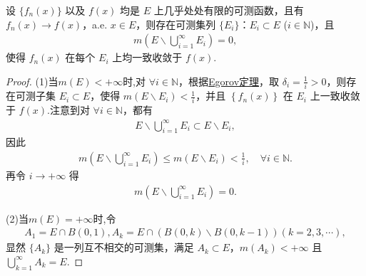\documentclass[../../main.tex]{subfiles}%
\begin{document}
\begin{corollary}
设 $\{f_n(x)\}$ 以及 $f(x)$ 均是 $E$ 上几乎处处有限的可测函数，且有 $f_n(x)\to f(x)$，a.e. $x\in E$，则存在可测集列 $\{E_i\}$：$E_i\subset E$ ($i\in\mathbb{N}$)，且
\begin{align*}
m\left(E\backslash\bigcup_{i = 1}^{\infty}E_i\right)=0,
\end{align*}
使得 $f_n(x)$ 在每个 $E_i$ 上均一致收敛于 $f(x)$. 
\end{corollary}
\begin{proof}

(1)当$m(E)<+\infty$时,对 $\forall i\in \mathbb{N}$，根据\hyperref[theorem:Egorov定理]{Egorov定理}，取 $\delta _i=\frac{1}{i}>0$，则存在可测子集 $E_i\subset E$，使得 $m\left( E\backslash E_i \right) <\frac{1}{i}$，并且 $\left\{ f_n\left( x \right) \right\}$ 在 $E_i$ 上一致收敛于 $f\left( x \right)$.注意到对 $\forall i\in \mathbb{N}$，都有
\begin{align*}
E\backslash \bigcup_{i=1}^{\infty}{E_i}\subset E\backslash E_i,
\end{align*}
因此
\begin{align*}
m\left( E\backslash \bigcup_{i=1}^{\infty}{E_i} \right) \leqslant m\left( E\backslash E_i \right) <\frac{1}{i},\quad \forall i\in \mathbb{N}.
\end{align*}
再令 $i\rightarrow +\infty$ 得
\begin{align*}
m\left( E\backslash \bigcup_{i=1}^{\infty}{E_i} \right) =0.
\end{align*}

(2)当$m(E)=+\infty$时,令
\begin{align*}
A_1=E\cap B(0,1),
A_k=E\cap (B(0,k)\backslash B(0,k - 1))(k = 2,3,\cdots),
\end{align*}
显然 $\{A_k\}$ 是一列互不相交的可测集，满足 $A_k\subset E$，$m(A_k)<+\infty$ 且 $\bigcup_{k = 1}^{\infty}A_k=E$.


\end{proof}
\end{document}
